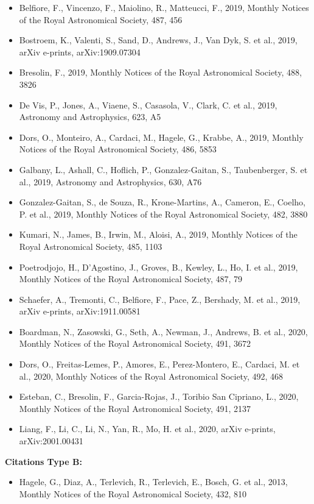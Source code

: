 \documentclass{letter}
\begin{document}
\begin{enumerate}
\begin{itemize}
\item Belfiore, F., Vincenzo, F., Maiolino, R., Matteucci, F., 2019, Monthly Notices of the Royal Astronomical Society, 487, 456
\item Bostroem, K., Valenti, S., Sand, D., Andrews, J., Van Dyk, S. et al., 2019, arXiv e-prints, arXiv:1909.07304
\item Bresolin, F., 2019, Monthly Notices of the Royal Astronomical Society, 488, 3826
\item De Vis, P., Jones, A., Viaene, S., Casasola, V., Clark, C. et al., 2019, Astronomy and Astrophysics, 623, A5
\item Dors, O., Monteiro, A., Cardaci, M., Hagele, G., Krabbe, A., 2019, Monthly Notices of the Royal Astronomical Society, 486, 5853
\item Galbany, L., Ashall, C., Hoflich, P., Gonzalez-Gaitan, S., Taubenberger, S. et al., 2019, Astronomy and Astrophysics, 630, A76
\item Gonzalez-Gaitan, S., de Souza, R., Krone-Martins, A., Cameron, E., Coelho, P. et al., 2019, Monthly Notices of the Royal Astronomical Society, 482, 3880
\item Kumari, N., James, B., Irwin, M., Aloisi, A., 2019, Monthly Notices of the Royal Astronomical Society, 485, 1103
\item Poetrodjojo, H., D'Agostino, J., Groves, B., Kewley, L., Ho, I. et al., 2019, Monthly Notices of the Royal Astronomical Society, 487, 79
\item Schaefer, A., Tremonti, C., Belfiore, F., Pace, Z., Bershady, M. et al., 2019, arXiv e-prints, arXiv:1911.00581
\item Boardman, N., Zasowski, G., Seth, A., Newman, J., Andrews, B. et al., 2020, Monthly Notices of the Royal Astronomical Society, 491, 3672
\item Dors, O., Freitas-Lemes, P., Amores, E., Perez-Montero, E., Cardaci, M. et al., 2020, Monthly Notices of the Royal Astronomical Society, 492, 468
\item Esteban, C., Bresolin, F., Garcia-Rojas, J., Toribio San Cipriano, L., 2020, Monthly Notices of the Royal Astronomical Society, 491, 2137
\item Liang, F., Li, C., Li, N., Yan, R., Mo, H. et al., 2020, arXiv e-prints, arXiv:2001.00431
\end{itemize}
{\bf Citations Type B:}
\begin{itemize}
\item Hagele, G., Diaz, A., Terlevich, R., Terlevich, E., Bosch, G. et al., 2013, Monthly Notices of the Royal Astronomical Society, 432, 810

\end{itemize}
\end{enumerate}
\end{document}
